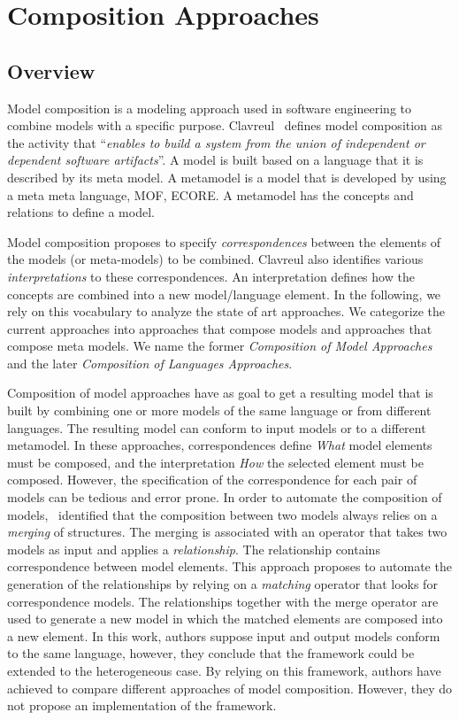 \section{Composition Approaches}
\subsection{Overview}
Model composition is a modeling approach used in software engineering to combine models with a specific purpose. Clavreul~\cite{clavreulmodelcompo} defines model composition as the activity that ``\textit{enables to build a system from the union of independent or dependent software artifacts}''. A model is built based on a language that it is described by its meta model. A metamodel is a model that is developed by using a meta meta language, \eg MOF, ECORE. A metamodel has the concepts and relations to define a model.

Model composition proposes to specify \emph{correspondences} between the elements of the models (or meta-models) to be combined. Clavreul also identifies various \emph{interpretations} to these correspondences. An interpretation defines how the concepts are combined into a new model/language element. In the following, we rely on this vocabulary to analyze the state of art approaches. We categorize the current approaches into approaches that compose models and approaches that compose meta models. We name the former \emph{Composition of Model Approaches} and the later \emph{Composition of Languages Approaches}.    

Composition of model approaches have as goal to get a resulting model that is built by combining one or more models of the same language or from different languages. The resulting model can conform to input models or to a different metamodel. In these approaches, correspondences define \emph{What} model elements must be composed, and the interpretation \emph{How} the selected element must be composed. However, the specification of the correspondence for each pair of models can be tedious and error prone. In order to automate the composition of models,~\cite{mergemanifest} identified that the composition between two models always relies on a \emph{merging} of structures. The merging is associated with an operator that takes two models as input and applies a \emph{relationship}. The relationship contains correspondence between model elements. This approach proposes to automate the generation of the relationships by relying on a \emph{matching} operator that looks for correspondence models. The relationships together with the merge operator are used to generate a new model in which the matched elements are composed into a new element. In this work, authors suppose input and output models conform to the same language, however, they conclude that the framework could be extended to the heterogeneous case. By relying on this framework, authors have achieved to compare different approaches of model composition. However, they do not propose an implementation of the framework. 

